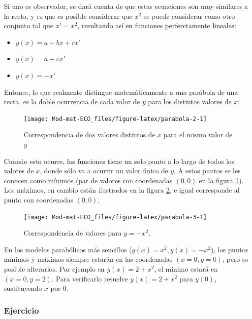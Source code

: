 \documentclass[
]{book}
\providecommand{\tightlist}{%
  \setlength{\itemsep}{0pt}\setlength{\parskip}{0pt}}
\begin{document}
Si uno es observador, se dará cuenta de que estas ecuaciones son muy similares a la recta, y es que es posible considerar que \(x^2\) se puede considerar como otro conjunto tal que \(x' = x^2\), resultando así en funciones perferctamente lineales:

\begin{itemize}
\tightlist
\item
  \(y(x) = a + bx + cx'\)
\item
  \(y(x) = a + cx'\)
\item
  \(y(x) = -x'\)
\end{itemize}

Entonce, lo que realmente distingue matemáticamente a una parábola de una recta, es la doble ocurrencia de cada valor de \(y\) para los distintos valores de \(x\):

\begin{figure}

{\centering \texttt{[image: Mod-mat-ECO\_files/figure-latex/parabola-2-1]} 

}

\caption{Correspondencia de dos valores distintos de $x$ para el mismo valor de $y$}\label{fig:parabola-2}
\end{figure}

Cuando esto ocurre, las funciones tiene un solo punto a lo largo de todos los valores de \(x\), donde sólo va a ocurrir un valor único de \(y\). A estos puntos se les conocen como mínimos (par de valores con coordenadas \((0, 0)\) en la figura \ref{fig:parabola-2}). Los máximos, en cambio están ilustrados en la figura \ref{fig:parabola-3}, e igual corresponde al punto con coordenadas \((0, 0)\).

\begin{figure}

{\centering \texttt{[image: Mod-mat-ECO\_files/figure-latex/parabola-3-1]} 

}

\caption{Correspondencia de valores para $y = -x^2$.}\label{fig:parabola-3}
\end{figure}

En los modelos parabólicos más sencillos (\(y(x) = x^2, y(x) = -x^2\)), los puntos mínimos y máximos siempre estarán en las coordenadas \((x = 0, y = 0)\), pero es posible alterarlos. Por ejemplo en \(y(x) = 2 + x^2\), el mínimo estará en \((x = 0, y = 2)\). Para verificarlo resuelve \(y(x) = 2 + x^2\) para \(y(0)\), sustituyendo \(x\) por \(0\).

\hypertarget{ejercicio}{%
\subsubsection{Ejercicio}\label{ejercicio}}
\end{document}
